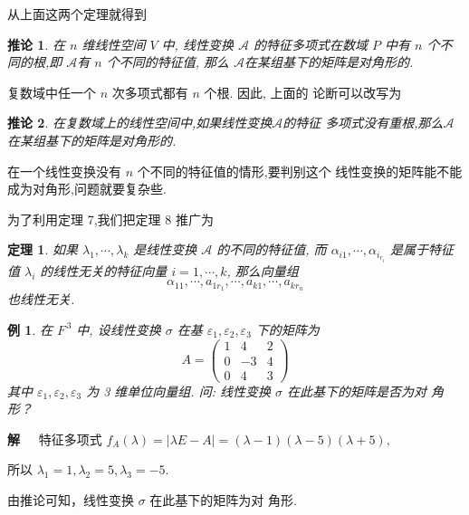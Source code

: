\documentclass[13pt]{beamer}
\newtheorem{thm}{定理}
\newtheorem{exa}{例}
\newtheorem*{coro}{推论}
\def\sol{{\bf 解~~ }}
\def\A{\mathscr{A}}
\begin{document}
\begin{frame}
从上面这两个定理就得到

\begin{coro}
	在 $n$ 维线性空间 $V$ 中, 线性变换 $\A$ 的特征多项式在数域 $P$ 中有 $n$ 个不同的根,即 $\A$有 $n$ 个不同的特征值, 那么 $\A$在某组基下的矩阵是对角形的.
\end{coro}

复数域中任一个 $n$ 次多项式都有 $n$ 个根. 因此, 上面的 论断可以改写为 
\begin{coro}
	在复数域上的线性空间中,如果线性变换$\A$的特征 多项式没有重根,那么$\A$在某组基下的矩阵是对角形的. 
\end{coro}
\end{frame}

\begin{frame}
 在一个线性变换没有 $n$ 个不同的特征值的情形,要判别这个 线性变换的矩阵能不能成为对角形,问题就要复杂些.
 
 为了利用定理 7,我们把定理 8 推广为 
\begin{thm}
	如果 $\lambda_{1}, \cdots, \lambda_{k}$ 是线性变换 $\A$ 的不同的特征值, 
	而 ${\alpha}_{i 1}, \cdots, {\alpha}_{i_{r_i}}$ 是属于特征值 $\lambda_{i}$ 的线性无关的特征向量 $i=1, \cdots, k$, 
	那么向量组 $${\alpha}_{11}, \cdots, {a}_{1 r_{1}}, \cdots, {a}_{k 1}, \cdots, {a}_{k r_{n}}$$ 也线性无关.
\end{thm}
\end{frame}


\begin{frame}
\begin{exa}
	在 $F^{\, 3}$ 中, 设线性变换 $\sigma$ 在基 $\varepsilon_{1}, \varepsilon_{2}, \varepsilon_{3}$ 下的矩阵为
	\[
	A=\left(\begin{array}{ccc}
	1 & 4 & 2 \\
	0 & -3 & 4 \\
	0 & 4 & 3
	\end{array}\right)
	\]
	其中 $\varepsilon_{1}, \varepsilon_{2}, \varepsilon_{3}$ 为 3 维单位向量组.	
	问: 线性变换 $\sigma$ 在此基下的矩阵是否为对 角形？
\end{exa}
\pause
\sol 特征多项式 $f_{A}(\lambda)=|\lambda E-A|=(\lambda-1)(\lambda-5)(\lambda+5),$

 所以 $\lambda_{1}=1, \lambda_{2}=5, \lambda_{3}=-5.$

由推论可知，线性变换 $\sigma$ 在此基下的矩阵为对 角形.
\end{frame}
\end{document}
